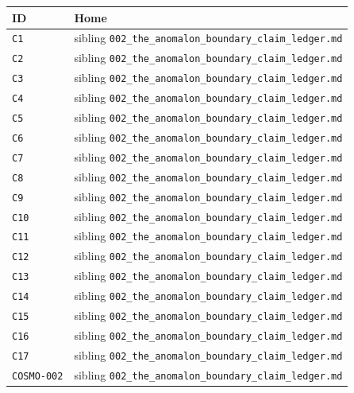 \documentclass[
  10pt,
]{article}
\DeclareRobustCommand{\texttt}[1]{{\paperSymbolFont\nolinkurl{#1}}}
\begin{document}
\begin{longtable}[]{@{}ll@{}}
\toprule\noalign{}
ID & Home \\
\midrule\noalign{}
\endhead
\bottomrule\noalign{}
\endlastfoot
\texttt{C1} & sibling \texttt{002\_the\_anomalon\_boundary\_claim\_ledger.md} \\
\texttt{C2} & sibling \texttt{002\_the\_anomalon\_boundary\_claim\_ledger.md} \\
\texttt{C3} & sibling \texttt{002\_the\_anomalon\_boundary\_claim\_ledger.md} \\
\texttt{C4} & sibling \texttt{002\_the\_anomalon\_boundary\_claim\_ledger.md} \\
\texttt{C5} & sibling \texttt{002\_the\_anomalon\_boundary\_claim\_ledger.md} \\
\texttt{C6} & sibling \texttt{002\_the\_anomalon\_boundary\_claim\_ledger.md} \\
\texttt{C7} & sibling \texttt{002\_the\_anomalon\_boundary\_claim\_ledger.md} \\
\texttt{C8} & sibling \texttt{002\_the\_anomalon\_boundary\_claim\_ledger.md} \\
\texttt{C9} & sibling \texttt{002\_the\_anomalon\_boundary\_claim\_ledger.md} \\
\texttt{C10} & sibling \texttt{002\_the\_anomalon\_boundary\_claim\_ledger.md} \\
\texttt{C11} & sibling \texttt{002\_the\_anomalon\_boundary\_claim\_ledger.md} \\
\texttt{C12} & sibling \texttt{002\_the\_anomalon\_boundary\_claim\_ledger.md} \\
\texttt{C13} & sibling \texttt{002\_the\_anomalon\_boundary\_claim\_ledger.md} \\
\texttt{C14} & sibling \texttt{002\_the\_anomalon\_boundary\_claim\_ledger.md} \\
\texttt{C15} & sibling \texttt{002\_the\_anomalon\_boundary\_claim\_ledger.md} \\
\texttt{C16} & sibling \texttt{002\_the\_anomalon\_boundary\_claim\_ledger.md} \\
\texttt{C17} & sibling \texttt{002\_the\_anomalon\_boundary\_claim\_ledger.md} \\
\texttt{COSMO-002} & sibling \texttt{002\_the\_anomalon\_boundary\_claim\_ledger.md} \\
\end{longtable}
\end{document}
